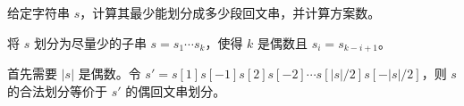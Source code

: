 \begin{exercise}
    给定字符串 $s$，计算其最少能划分成多少段回文串，并计算方案数。
\end{exercise}

\begin{exercise}
    将 $s$ 划分为尽量少的子串 $s=s_1\cdots s_k$，使得 $k$ 是偶数且 $s_i=s_{k-i+1}$。
\end{exercise}
\begin{solution}
    首先需要 $|s|$ 是偶数。令 $s'=s[1]s[-1]s[2]s[-2]\cdots s[|s|/2]s[-|s|/2]$，则 $s$ 的合法划分等价于 $s'$ 的偶回文串划分。
\end{solution}

